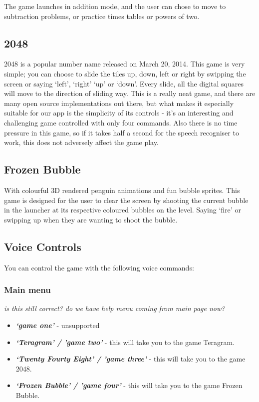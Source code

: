 \documentclass[11pt, oneside]{article}
\begin{document}
The game launches in addition mode, and the user can chose to move to
subtraction problems, or practice times tables or powers of two.

\subsection{2048}

2048 is a popular number name released on March 20, 2014. This game is
very simple; you can choose to slide the tiles up, down, left or right
by swipping the screen or saying `left', `right' `up' or `down'. Every
slide, all the digital squares will move to the direction of sliding
way. This is a really neat game, and there are many open source
implementations out there, but what makes it especially suitable for
our app is the simplicity of its controls - it's an interesting and
challenging game controlled with only four commands. Also there is no
time pressure in this game, so if it takes half a second for the
speech recogniser to work, this does not adversely affect the game
play.

\subsection{Frozen Bubble}
With colourful 3D rendered penguin animations and fun bubble sprites. 
This game is designed for the user to clear the screen by shooting the 
current bubble in the launcher at its respective coloured bubbles on 
the level. Saying `fire' or swipping up when they are wanting to shoot
the bubble.  

\subsection{Voice Controls}

You can control the game with the following voice commands:

\subsubsection{Main menu}

{\em is this still correct? do we have help menu coming from main page now?}

\begin{itemize}
  \item {\em\bf`game one'} - unsupported
  \item {\em\bf`Teragram' / 'game two'}  - this will take you to the game Teragram.
  \item {\em\bf`Twenty Fourty Eight' / 'game three'} - this will take you to the game 2048.
  \item {\em\bf`Frozen Bubble' / 'game four'} - this will take you to the game Frozen Bubble.
\end{itemize}
\end{document}
